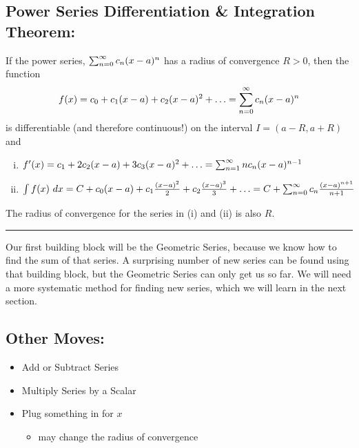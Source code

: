 \documentclass[10pt]{article}
\begin{document}
\subsection*{Power Series Differentiation \& Integration Theorem:}
If the power series, \(\sum_{n=0}^\infty c_n (x-a)^n\) has a radius of convergence \(R>0\), then the function
\[
f(x) = c_0 + c_1(x-a) + c_2(x-a)^2 + \ldots = \sum_{n=0}^\infty c_n (x-a)^n
\]
is differentiable (and therefore continuous!) on the interval \(I=(a-R, a+R)\) and
 \begin{enumerate}[(i)] 
 \item \(
f'(x) = c_1 + 2c_2(x-a) + 3c_3(x-a)^2 + \ldots = \sum_{n=1}^\infty n c_n (x-a)^{n-1}
\)
 \item \(
\int f(x)\ dx = C + c_0(x-a) + c_1\frac{(x-a)^2}{2} + c_2\frac{(x-a)^3}{3} + \ldots = C+\sum_{n=0}^\infty c_n \frac{(x-a)^{n+1}}{n+1}
\)
 \end{enumerate}
The radius of convergence for the series in (i) and (ii) is also \(R\).\\


\hrule
\vspace*{.2in}

Our first building block will be the Geometric Series, because we know how to find the sum of that series. A surprising number of new series can be found using that building block, but the Geometric Series can only get us so far. We will need a more systematic method for finding new series, which we will learn in the next section.

\callout{
\[
\text{Geometric Series:}\qquad  \frac{1}{1-x}  = \sum_{n=0}^\infty x^{n}= 1+x+x^2+x^3+x^4+\ldots , \quad R=1
\]

}
\hspace*{.25in}
\subsection*{Other Moves:}
\begin{itemize}
\item Add or Subtract Series
\item Multiply Series by a Scalar
\item Plug something in for \(x\)
\begin{itemize}
\item may change the radius of convergence
\end{itemize}
\end{itemize}
\end{document}
